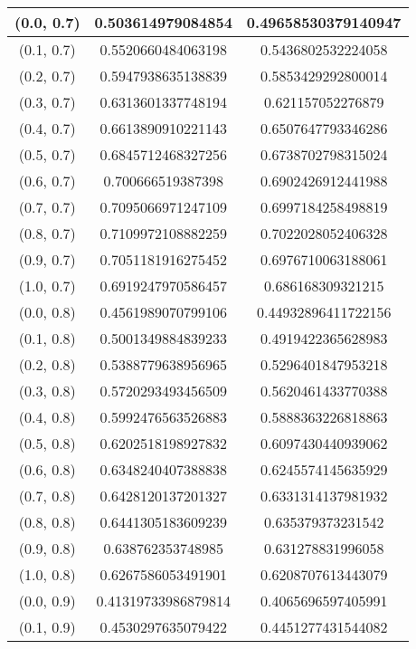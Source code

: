 \begin{table}[H]
\begin{tabular}{|c|c|c|}
\hline
(0.0, 0.7) & 0.503614979084854 & 0.49658530379140947 \\
\hline
(0.1, 0.7) & 0.5520660484063198 & 0.5436802532224058 \\
\hline
(0.2, 0.7) & 0.5947938635138839 & 0.5853429292800014 \\
\hline
(0.3, 0.7) & 0.6313601337748194 & 0.621157052276879 \\
\hline
(0.4, 0.7) & 0.6613890910221143 & 0.6507647793346286 \\
\hline
(0.5, 0.7) & 0.6845712468327256 & 0.6738702798315024 \\
\hline
(0.6, 0.7) & 0.700666519387398 & 0.6902426912441988 \\
\hline
(0.7, 0.7) & 0.7095066971247109 & 0.6997184258498819 \\
\hline
(0.8, 0.7) & 0.7109972108882259 & 0.7022028052406328 \\
\hline
(0.9, 0.7) & 0.7051181916275452 & 0.6976710063188061 \\
\hline
(1.0, 0.7) & 0.6919247970586457 & 0.686168309321215 \\
\hline
\hline
(0.0, 0.8) & 0.4561989070799106 & 0.44932896411722156 \\
\hline
(0.1, 0.8) & 0.5001349884839233 & 0.4919422365628983 \\
\hline
(0.2, 0.8) & 0.5388779638956965 & 0.5296401847953218 \\
\hline
(0.3, 0.8) & 0.5720293493456509 & 0.5620461433770388 \\
\hline
(0.4, 0.8) & 0.5992476563526883 & 0.5888363226818863 \\
\hline
(0.5, 0.8) & 0.6202518198927832 & 0.6097430440939062 \\
\hline
(0.6, 0.8) & 0.6348240407388838 & 0.6245574145635929 \\
\hline
(0.7, 0.8) & 0.6428120137201327 & 0.6331314137981932 \\
\hline
(0.8, 0.8) & 0.6441305183609239 & 0.635379373231542 \\
\hline
(0.9, 0.8) & 0.638762353748985 & 0.631278831996058 \\
\hline
(1.0, 0.8) & 0.6267586053491901 & 0.6208707613443079 \\
\hline
\hline
(0.0, 0.9) & 0.41319733986879814 & 0.4065696597405991 \\
\hline
(0.1, 0.9) & 0.4530297635079422 & 0.4451277431544082 \\

\end{tabular}
\end{table}
